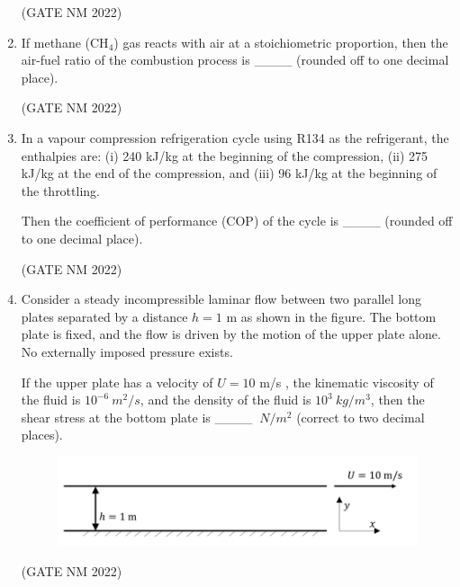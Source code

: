 \documentclass[journal,12pt,onecolumn]{IEEEtran}
\theoremstyle{remark}
\begin{document}
\begin{enumerate}
\hfill(GATE NM 2022)





\item
If methane (CH$_4$) gas reacts with air at a stoichiometric proportion, then the air-fuel ratio of the combustion process is  
\_\_\_\_ (rounded off to one decimal place).

\hfill(GATE NM 2022)





\item 
In a vapour compression refrigeration cycle using R134 as the refrigerant, the enthalpies are:  
(i) 240 kJ/kg at the beginning of the compression,  
(ii) 275 kJ/kg at the end of the compression, and  
(iii) 96 kJ/kg at the beginning of the throttling.  

Then the coefficient of performance (COP) of the cycle is \_\_\_\_  (rounded off to one decimal place).

\hfill(GATE NM 2022)







\item  
Consider a steady incompressible laminar flow between two parallel long plates separated by a distance  
$h = 1$ m  as shown in the figure.  
The bottom plate is fixed, and the flow is driven by the motion of the upper plate alone.  
No externally imposed pressure exists.  

If the upper plate has a velocity of $U = 10$ m/s , the kinematic viscosity of the fluid is  
$10^{-6}\ m^2/s$, and the density of the fluid is $10^3\ kg/m^3$,  
then the shear stress at the bottom plate is \_\_\_\_  $\ N/m^2  $ (correct to two decimal places).

\begin{figure}[h]
	\centering
	\includegraphics[width=0.5\columnwidth]{fig15}
	\caption{}
	\label{fig:placeholder}
\end{figure}

\hfill(GATE NM 2022)











\end{enumerate}
\end{document}
